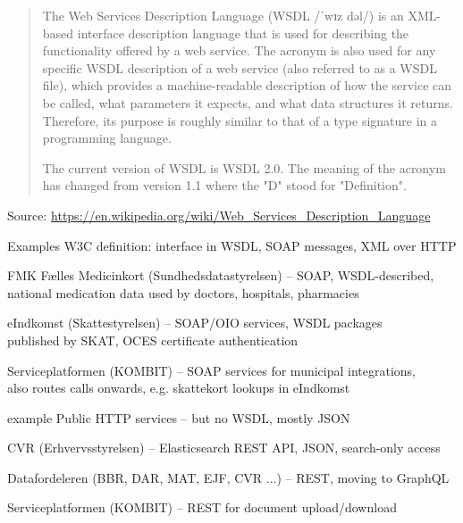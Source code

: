 \documentclass[Screen16to9,17pt]{foils}
\begin{document}
\begin{quote}
  The Web Services Description Language (WSDL /ˈwɪz dəl/) is an XML-based interface description language that is used for describing the functionality offered by a web service. The acronym is also used for any specific WSDL description of a web service (also referred to as a WSDL file), which provides a machine-readable description of how the service can be called, what parameters it expects, and what data structures it returns. Therefore, its purpose is roughly similar to that of a type signature in a programming language.

  The current version of WSDL is WSDL 2.0. The meaning of the acronym has changed from version 1.1 where the "D" stood for "Definition".
\end{quote}
Source: \url{https://en.wikipedia.org/wiki/Web_Services_Description_Language}





Examples W3C definition: interface in WSDL, SOAP messages, XML over HTTP

\begin{list2}
\item FMK Fælles Medicinkort (Sundhedsdatastyrelsen) -- SOAP, WSDL-described,\\
  national medication data used by doctors, hospitals, pharmacies
\item eIndkomst (Skattestyrelsen) -- SOAP/OIO services, WSDL packages\\
  published by SKAT, OCES certificate authentication
\item Serviceplatformen (KOMBIT) -- SOAP services for municipal integrations,\\
  also routes calls onwards, e.g. skattekort lookups in eIndkomst
\end{list2}





example Public HTTP services -- but no WSDL, mostly JSON
\begin{list2}
\item CVR (Erhvervsstyrelsen) -- Elasticsearch REST API, JSON, search-only access
\item Datafordeleren (BBR, DAR, MAT, EJF, CVR ...) -- REST, moving to GraphQL
\item Serviceplatformen (KOMBIT) -- REST for document upload/download
\end{list2}
\end{document}
